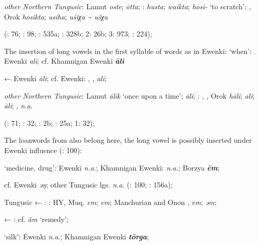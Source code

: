 \documentclass[output=paper,colorlinks,citecolor=brown]{langscibook}
\begin{document}
    \textit{other Northern Tungusic}: Lamut \textit{oste};  \textit{ōtta}; \textit{}:  \textit{husta};  \textit{waikta};  \textit{hosi-} ‘to scratch’; , Orok \textit{hosikta};  \textit{usiha};  \textit{uśiχa {\textasciitilde} ušχa}
    
    (\citealt{Castrén1856}: 76; \citealt{Janhunen1991}: 98; \citealt{Dorji1998}: 535a; \citealt{Vasilevic1958}: 328b; \citealt{Cincius1975B} 2: 26b; \citealt{Hauer1952} 3: 973; \citealt{Zikmundová2013a}: 224);
\z
\z


\ea
The insertion of long vowels in the first syllable of words as in  Ewenki:
\ea ‘when’:  Ewenki \textit{alī}; cf. Khamnigan Ewenki \textbf{\textit{āli}}

    ←  Ewenki \textit{āli}; cf.  Ewenki: , ,  \textit{alī};

    \textit{other Northern Tungusic}: Lamut \textit{ālik} ‘once upon a time’;  \textit{āli}; \textit{}: , , Orok \textit{hāli};  \textit{ali};  \textit{āli}; ,  \textit{n.a}.
    
    (\citealt{Castrén1856}: 71; \citealt{Janhunen1991}: 32; \citealt{Dorji1998}: 2b; \citealt{Vasilevic1958}: 25a; \citealt{Cincius1975B} 1: 32);

\z
\z

The loanwords from  also belong here, the long vowel is possibly inserted under  Ewenki influence (\citealt{Janhunen1991}: 100):

\ea ‘medicine, drug’:  Ewenki \textit{n.a}.; Khamnigan Ewenki:  \textit{n.a.}; Borzya \textbf{\textit{ēm}};

    cf.  Ewenki \textit{ǝŋ}; other Tungusic lgs. \textit{n.a}. (\citealt{Janhunen1991}: 100; \citealt{Dorji1998}: 156a);

    Tungusic ← : : HY, Muq. \textit{em};  \textit{em}; Manchurian and Onon ,  \textit{em};  \textit{ǝm};

     ← : cf.  \textit{äm} ‘remedy’;

    \ex ‘silk’:  Ewenki \textit{n.a}.; Khamnigan Ewenki \textbf{\textit{tōrga}};
\end{document}
